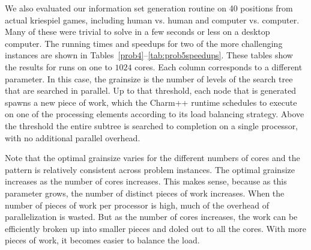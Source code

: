 \documentclass[times, 10pt,twocolumn]{article}
\begin{document}
\label{Results}
We also evaluated our information set generation routine on 40 positions from actual kriespiel games, including human vs. human and computer vs. computer.  Many of these were trivial to solve in a few seconds or less on a desktop computer.  The running times and speedups for two of the more challenging instances are shown in Tables~\ref{prob4}--\ref{tab:prob5speedups}.  These tables show the results for runs on one to $1024$ cores.  Each column corresponds to a different parameter.  In this case, the grainsize is the number of levels of the search tree that are searched in parallel.  Up to that threshold, each node that is generated spawns a new piece of work, which the {\sc Charm++} runtime schedules to execute on one of the processing elements according to its load balancing strategy.  Above the threshold the entire subtree is searched to completion on a single processor, with no additional parallel overhead. 

Note that the optimal grainsize varies for the different numbers of cores and the pattern is relatively consistent across problem instances.  The optimal grainsize increases as the number of cores increases.  This makes sense, because as this parameter grows, the number of distinct pieces of work increases.  When the number of pieces of work per processor is high, much of the overhead of parallelization is wasted.  But as the number of cores increases, the work can be efficiently broken up into smaller pieces and doled out to all the cores.  With more pieces of work, it becomes easier to balance the load.
\end{document}
